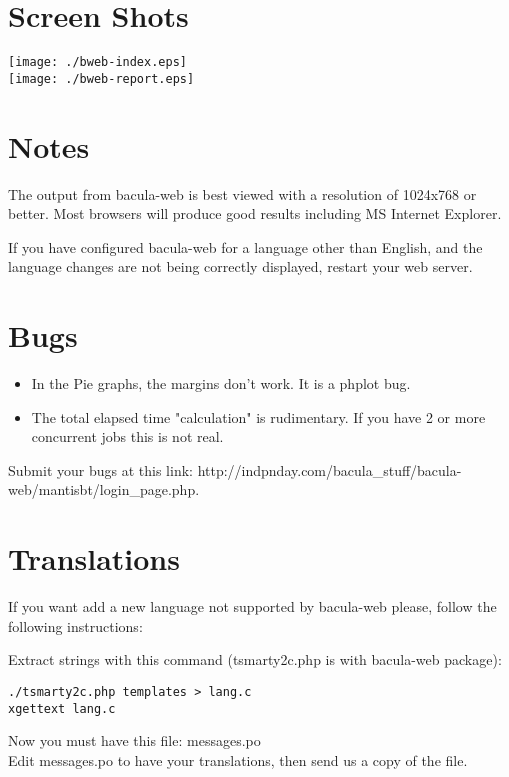 
\section*{Screen Shots}

\texttt{[image: ./bweb-index.eps]} \\
\texttt{[image: ./bweb-report.eps]} \\

 

\section*{Notes}
The output from bacula-web is best viewed with a resolution of
1024x768 or better. Most browsers will produce good results including 
MS Internet Explorer.

If you have configured bacula-web for a language other than English,
and the language changes are not being correctly displayed, restart
your web server.

\section*{Bugs}

\begin{itemize}
\item In the Pie graphs, the margins don't work. It is a phplot bug.
\item The total elapsed time "calculation" is rudimentary.  If you have 2
or more concurrent jobs this is not real.
\end{itemize}

Submit your bugs at this link: 
{http://indpnday.com/bacula_stuff/bacula-web/mantisbt/login_page.php}.


\section*{Translations}
If you want add a new language not supported by bacula-web please, follow
the following instructions:

Extract strings with this command (tsmarty2c.php is with bacula-web 
package):\\

\begin{verbatim}
./tsmarty2c.php templates > lang.c
xgettext lang.c
\end{verbatim}

Now you must have this file: messages.po \\
Edit messages.po to have your translations, then
send us a copy of the file.\\
